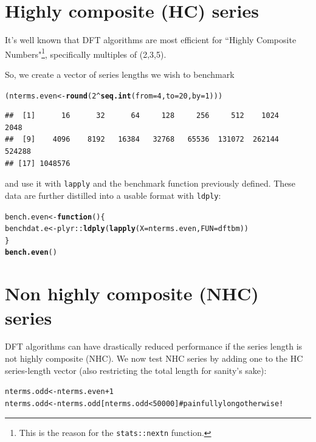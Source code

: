 \documentclass[12pt]{article}\usepackage{graphicx, color}
\makeatletter
\newcommand{\hlfunctioncall}[1]{\textcolor[rgb]{0.501960784313725,0,0.329411764705882}{\textbf{#1}}}%
\newcommand{\hlcomment}[1]{\textcolor[rgb]{0.180392156862745,0.6,0.341176470588235}{#1}}%
\newenvironment{kframe}{%
 \def\at@end@of@kframe{}%
 \ifinner\ifhmode%
  \def\at@end@of@kframe{\end{minipage}}%
  \begin{minipage}{\columnwidth}%
 \fi\fi%
 \def\FrameCommand##1{\hskip\@totalleftmargin \hskip-\fboxsep
 \colorbox{shadecolor}{##1}\hskip-\fboxsep
     \hskip-\linewidth \hskip-\@totalleftmargin \hskip\columnwidth}%
 \MakeFramed {\advance\hsize-\width
   \@totalleftmargin\z@ \linewidth\hsize
   \@setminipage}}%
 {\par\unskip\endMakeFramed%
 \at@end@of@kframe}
\newenvironment{knitrout}{}{} %
\newcommand{\Rcmd}[1]{\texttt{#1}}
\makeatother
\begin{document}
\section{Highly composite (HC) series}
It's well known that DFT algorithms are most efficient
for ``Highly Composite Numbers"\footnote{
This is the reason for the \Rcmd{stats::nextn} function.
}, specifically multiples of (2,3,5).

So, we create a vector of series lengths we wish to benchmark
\begin{knitrout}
\color{fgcolor}\begin{kframe}
\begin{alltt}
(nterms.even <- \hlfunctioncall{round}(2^\hlfunctioncall{seq.int}(from = 4, to = 20, by = 1)))
\end{alltt}
\begin{verbatim}
##  [1]      16      32      64     128     256     512    1024    2048
##  [9]    4096    8192   16384   32768   65536  131072  262144  524288
## [17] 1048576
\end{verbatim}
\end{kframe}
\end{knitrout}

and use it with \Rcmd{lapply} and the benchmark function
previously defined.
These data are further distilled into a usable format
with \Rcmd{ldply}:
\begin{knitrout}
\color{fgcolor}\begin{kframe}
\begin{alltt}
bench.even <- \hlfunctioncall{function}() \{
    benchdat.e <- plyr::\hlfunctioncall{ldply}(\hlfunctioncall{lapply}(X = nterms.even, FUN = dftbm))
\}
\hlfunctioncall{bench.even}()
\end{alltt}
\end{kframe}
\end{knitrout}


\section{Non highly composite (NHC) series}
DFT algorithms can have drastically reduced performance
if the series length is not highly composite (NHC).
We now test NHC series by adding one to the HC series-length
vector (also restricting the total length for sanity's sake):
\begin{knitrout}
\color{fgcolor}\begin{kframe}
\begin{alltt}
nterms.odd <- nterms.even + 1
nterms.odd <- nterms.odd[nterms.odd < 50000]  \hlcomment{# painfully long otherwise!}
\end{alltt}
\end{kframe}
\end{knitrout}
\end{document}
